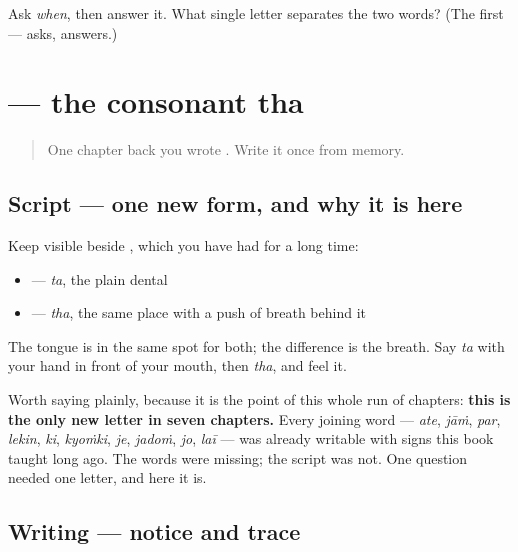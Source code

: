 \begin{tcolorbox}[breakable,colback=teal!4,colframe=teal!35!black,title={Before you move on}]
Ask \emph{when}, then answer it. What single letter separates the two words? (The first — \textbf{} asks, \textbf{} answers.)
\end{tcolorbox}
\section[\texorpdfstring{\pa{ਥ} (tha)}{ਥ (tha)}]{ — the consonant tha}

\label{lesson:PA-W10-thatha}



\begin{quote}
One chapter back you wrote \textbf{}. Write it once from memory.
\end{quote}

\subsection*{Script — one new form, and why it is here}
Keep \textbf{} visible beside \textbf{}, which you have had for a long time:

\begin{itemize}
\raggedright
  \item \textbf{} — \emph{ta}, the plain dental
  \item \textbf{} — \emph{tha}, the same place with a push of breath behind it
\end{itemize}

The tongue is in the same spot for both; the difference is the breath. Say \emph{ta} with your hand in front of your mouth, then \emph{tha}, and feel it.

Worth saying plainly, because it is the point of this whole run of chapters: \textbf{this is the only new letter in seven chapters.} Every joining word — \emph{ate}, \emph{jāṁ}, \emph{par}, \emph{lekin}, \emph{ki}, \emph{kyoṁki}, \emph{je}, \emph{jadoṁ}, \emph{jo}, \emph{laī} — was already writable with signs this book taught long ago. The words were missing; the script was not. One question needed one letter, and here it is.

\subsection*{Writing — notice and trace}

